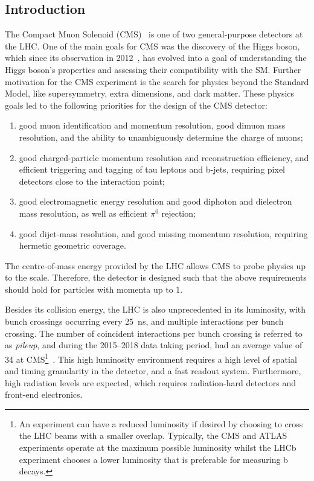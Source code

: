 \subsection{Introduction}
The Compact Muon Solenoid (CMS)~\cite{CMS:2008xjf} is one of two general-purpose detectors at the LHC. One of the main goals for CMS was the discovery of the Higgs boson, which since its observation in 2012~\cite{CMS:2012qbp,ATLAS:2012yve}, has evolved into a goal of understanding the Higgs boson's properties and assessing their compatibility with the SM. Further motivation for the CMS experiment is the search for physics beyond the Standard Model, like supersymmetry, extra dimensions, and dark matter. These physics goals led to the following priorities for the design of the CMS detector:
\begin{enumerate}
  \item good muon identification and momentum resolution, good dimuon mass resolution, and the ability to unambiguously determine the charge of muons;
  \item good charged-particle momentum resolution and reconstruction efficiency, and efficient triggering and tagging of tau leptons and b-jets, requiring pixel detectors close to the interaction point;
  \item good electromagnetic energy resolution and good diphoton and dielectron mass resolution, as well as efficient $\pi^0$ rejection;
  \item good dijet-mass resolution, and good missing momentum resolution, requiring hermetic geometric coverage.
\end{enumerate}
The centre-of-mass energy provided by the LHC allows CMS to probe physics up to the \TeV scale. Therefore, the detector is designed such that the above requirements should hold for particles with momenta up to 1\TeV. 

Besides its collision energy, the LHC is also unprecedented in its luminosity, with bunch crossings occurring every 25~\unit{ns}, and multiple interactions per bunch crossing. The number of coincident interactions per bunch crossing is referred to as \textit{pileup}, and during the 2015--2018 data taking period, had an average value of 34 at CMS\footnote{An experiment can have a reduced luminosity if desired by choosing to cross the LHC beams with a smaller overlap. Typically, the CMS and ATLAS experiments operate at the maximum possible luminosity whilst the LHCb experiment chooses a lower luminosity that is preferable for measuring b decays.}~\cite{LumiPubl64:online}. This high luminosity environment requires a high level of spatial and timing granularity in the detector, and a fast readout system. Furthermore, high radiation levels are expected, which requires radiation-hard detectors and front-end electronics.

